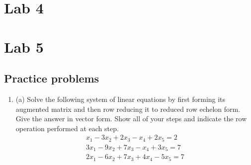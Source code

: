 \documentclass{article}
\begin{document}
\section{Lab 4}

\section{Lab 5}
\subsection{Practice problems}
\begin{enumerate}
	\item (a) Solve the following system of linear equations by first forming its augmented matrix and then row reducing it to reduced row echelon form. Give the answer in vector form. Show all of your steps and indicate the row operation performed at each step.
$$
\begin{array}{r}
x_1-3 x_2+2 x_3-x_4+2 x_5=2 \\
3 x_1-9 x_2+7 x_3-x_4+3 x_5=7 \\
2 x_1-6 x_2+7 x_3+4 x_4-5 x_5=7
\end{array}
$$


\end{enumerate}
\end{document}
